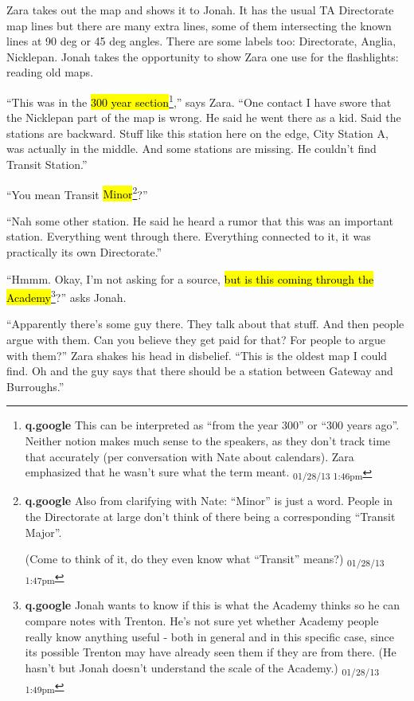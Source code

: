 Zara takes out the map and shows it to Jonah.  It has the usual TA Directorate map lines but there are many extra lines, some of them intersecting the known lines at 90 deg or 45 deg angles.  There are some labels too: Directorate, Anglia, Nicklepan.  Jonah takes the opportunity to show Zara one use for the flashlights: reading old maps.



``This was in the \hl{300 year section}\footnote{\textbf{q.google }This can be interpreted as ``from the year 300'' or ``300 years ago''.  Neither notion makes much sense to the speakers, as they don't track time that accurately (per conversation with Nate about calendars).  Zara emphasized that he wasn't sure what the term meant. \textsubscript{01/28/13 1:46pm}},'' says Zara.  ``One contact I have swore that the Nicklepan part of the map is wrong.  He said he went there as a kid.  Said the stations are backward.  Stuff like this station here on the edge, City Station A, was actually in the middle.  And some stations are missing.  He couldn't find Transit Station.''

``You mean Transit \hl{Minor}\footnote{\textbf{q.google }Also from clarifying with Nate: ``Minor'' is just a word.  People in the Directorate at large don't think of there being a corresponding ``Transit Major''.

(Come to think of it, do they even know what ``Transit'' means?) \textsubscript{01/28/13 1:47pm}}?''

``Nah some other station.  He said he heard a rumor that this was an important station. Everything went through there.  Everything connected to it, it was practically its own Directorate.''

``Hmmm.  Okay, I'm not asking for a source, \hl{but is this coming through the Academy}\footnote{\textbf{q.google }Jonah wants to know if this is what the Academy thinks so he can compare notes with Trenton.  He's not sure yet whether Academy people really know anything useful - both in general and in this specific case, since its possible Trenton may have already seen them if they are from there.  (He hasn't but Jonah doesn't understand the scale of the Academy.) \textsubscript{01/28/13 1:49pm}}?'' asks Jonah.

``Apparently there's some guy there. They talk about that stuff.  And then people argue with them.  Can you believe they get paid for that?  For people to argue with them?'' Zara shakes his head in disbelief.  ``This is the oldest map I could find.  Oh and the guy says that there should be a station between Gateway and Burroughs.''

